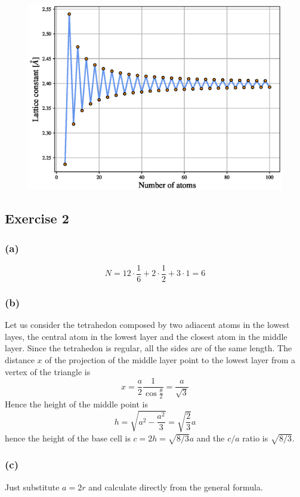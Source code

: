 \begin{figure}
    \centering 
    \includegraphics[scale=0.7]{figures/NaCl_constant.eps}
    \caption{}
    \label{fig:NaCl_constant}
\end{figure}

\subsection*{Exercise 2}
\subsubsection*{(a)}
$$N = 12 \cdot \frac{1}{6} + 2 \cdot \frac{1}{2} + 3 \cdot 1 = 6$$
\subsubsection*{(b)}
Let us consider the tetrahedon composed by two adiacent atoms in the lowest layes, the central atom in the lowest layer and the closest atom in the middle layer.
Since the tetrahedon is regular, all the sides are of the same length. The distance $x$ of the projection of the middle layer point to the lowest layer from a vertex of the triangle is 
$$x = \frac{a}{2}\frac{1}{\cos\frac{\theta}{2}} = \frac{a}{\sqrt{3}}$$
Hence the  height of the middle point is 
$$h = \sqrt{a^2 - \frac{a^2}{3}} = \sqrt{\frac{2}{3}}a$$ hence the height of the base cell is $c = 2h = \sqrt{8/3}a$ and the $c/a$ ratio is $\sqrt{8/3}$.
\subsubsection*{(c)}
Just substitute $a=2r$ and calculate directly from the general formula.

